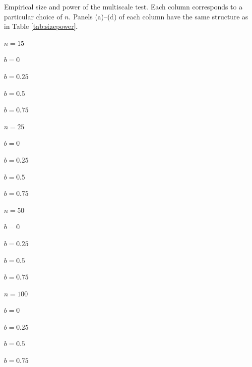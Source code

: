 \documentclass[12pt]{article}
\begin{document}
\begin{table}
\renewcommand{\arraystretch}{1.2}
\centering 
\footnotesize{
\caption{Empirical size and power of the multiscale test. Each column corresponds to a particular choice of $n$. Panels (a)--(d) of each column have the same structure as in Table \ref{tab:sizepower}.}\label{tab:large-n}
  
\begin{subtable}[c]{0.24\textwidth}
\centering  
\caption*{$n=15$}\vspace{0.1cm} 
\caption{$b=0$}
\vspace{0.25cm}
\caption{$b=0.25$}
\vspace{0.25cm}
\caption{$b=0.5$}
\vspace{0.25cm}
\caption{$b=0.75$}

\end{subtable}
\begin{subtable}[c]{0.24\textwidth}
\setcounter{subtable}{0}  
\centering  
\caption*{$n=25$}\vspace{0.1cm} 
\caption{$b=0$}
\vspace{0.25cm}
\caption{$b=0.25$}
\vspace{0.25cm}
\caption{$b=0.5$}
\vspace{0.25cm}
\caption{$b=0.75$}

\end{subtable}
\begin{subtable}[c]{0.24\textwidth}
\setcounter{subtable}{0}  
\centering  
\caption*{$n=50$}\vspace{0.1cm} 
\caption{$b=0$}
\vspace{0.25cm}
\caption{$b=0.25$}
\vspace{0.25cm}
\caption{$b=0.5$}
\vspace{0.25cm}
\caption{$b=0.75$}

\end{subtable}
\begin{subtable}[c]{0.24\textwidth}
\setcounter{subtable}{0}  
\centering  
\caption*{$n=100$}\vspace{0.1cm} 
\caption{$b=0$}
\vspace{0.25cm}
\caption{$b=0.25$}
\vspace{0.25cm}
\caption{$b=0.5$}
\vspace{0.25cm}
\caption{$b=0.75$}

\end{subtable}}

\end{table}
\end{document}
